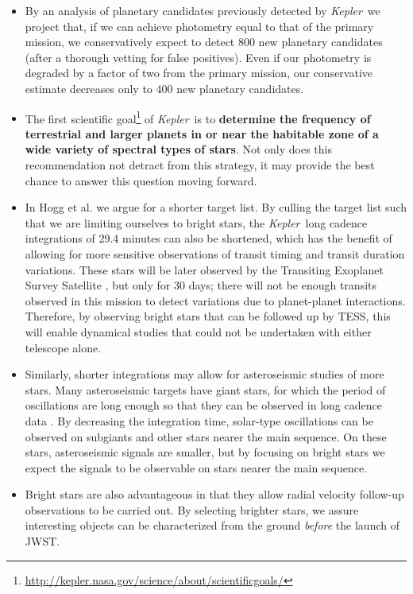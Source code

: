 \documentclass[12pt, preprint]{aastex}
\newcommand{\observatory}[1]{\textsl{#1}}
\newcommand{\kepler}{\observatory{Kepler}}
\newcommand{\Kepler}{\kepler}
\begin{document}
\begin{itemize}
\item
By an analysis of planetary candidates previously detected by \Kepler\ we 
 project that, if we can achieve photometry equal to that of the primary
 mission, we conservatively expect to detect 800 new planetary candidates 
 (after a thorough vetting for false positives). Even if our photometry is 
 degraded by a factor of two from the primary mission, our conservative
 estimate decreases only to 400 new planetary candidates.
\item
The first scientific goal\footnote{\url{http://kepler.nasa.gov/science/about/scientificgoals/}} of \Kepler\ is to \textbf{determine the frequency 
 of terrestrial and larger planets in or near the habitable zone of a wide 
 variety of spectral types of stars}. 
Not only does this recommendation not detract from this strategy, it may 
 provide the best chance to answer this question moving forward.
\item
In Hogg et al. we argue for a shorter target list. 
By culling the target list such that we are limiting ourselves to bright stars,
 the \Kepler\ long cadence integrations of 29.4 minutes can also be shortened,
 which has the benefit of 
 allowing for more sensitive observations of transit timing and transit
 duration variations.
These stars will be later observed by the Transiting Exoplanet Survey Satellite
 \citep[TESS][]{Brown08}, but only for 30 days; there will 
 not be enough transits observed in this mission to detect variations due to 
 planet-planet interactions.
Therefore, by observing bright stars that can be followed up by TESS, this 
 will enable dynamical studies that could not be undertaken with either 
 telescope alone.
\item
Similarly, shorter integrations may allow for asteroseismic studies of 
 more stars. 
Many asteroseismic targets have giant stars, for which 
 the period of oscillations are long enough so that they can be observed in 
 long cadence data \citep{Chaplin13}.
By decreasing the integration time, solar-type oscillations can be observed 
 on subgiants and other stars nearer the main sequence.
On these stars, asteroseismic signals are smaller, but by focusing on 
 bright stars we expect the signals to be observable on stars nearer the 
 main sequence.
\item
Bright stars are also advantageous in that they allow radial velocity follow-up
 observations to be carried out. 
By selecting brighter stars, we assure interesting objects can be characterized 
 from the ground \textit{before} the launch of JWST.
 
\end{itemize}
\end{document}
